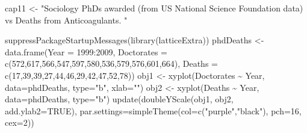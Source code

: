 \documentclass[
  10pt,
  b5paper]{book}
\newenvironment{Shaded}{\begin{snugshade}}{\end{snugshade}}
\newcommand{\AttributeTok}[1]{\textcolor[rgb]{0.77,0.63,0.00}{#1}}
\newcommand{\ConstantTok}[1]{\textcolor[rgb]{0.00,0.00,0.00}{#1}}
\newcommand{\DecValTok}[1]{\textcolor[rgb]{0.00,0.00,0.81}{#1}}
\newcommand{\FunctionTok}[1]{\textcolor[rgb]{0.00,0.00,0.00}{#1}}
\newcommand{\NormalTok}[1]{#1}
\newcommand{\OtherTok}[1]{\textcolor[rgb]{0.56,0.35,0.01}{#1}}
\newcommand{\SpecialCharTok}[1]{\textcolor[rgb]{0.00,0.00,0.00}{#1}}
\newcommand{\StringTok}[1]{\textcolor[rgb]{0.31,0.60,0.02}{#1}}
\begin{document}
\begin{Shaded}
\begin{Highlighting}[]
\NormalTok{cap11 }\OtherTok{\textless{}{-}} \StringTok{"Sociology PhDs awarded (from US National Science }
\StringTok{Foundation data) vs Deaths from Anticoagulants.}
\StringTok{"}
\end{Highlighting}
\end{Shaded}

\begin{Shaded}
\begin{Highlighting}[]
\FunctionTok{suppressPackageStartupMessages}\NormalTok{(}\FunctionTok{library}\NormalTok{(latticeExtra))}
\NormalTok{phdDeaths }\OtherTok{\textless{}{-}} \FunctionTok{data.frame}\NormalTok{(}\AttributeTok{Year =} \DecValTok{1999}\SpecialCharTok{:}\DecValTok{2009}\NormalTok{,}
\AttributeTok{Doctorates =} \FunctionTok{c}\NormalTok{(}\DecValTok{572}\NormalTok{,}\DecValTok{617}\NormalTok{,}\DecValTok{566}\NormalTok{,}\DecValTok{547}\NormalTok{,}\DecValTok{597}\NormalTok{,}\DecValTok{580}\NormalTok{,}\DecValTok{536}\NormalTok{,}\DecValTok{579}\NormalTok{,}\DecValTok{576}\NormalTok{,}\DecValTok{601}\NormalTok{,}\DecValTok{664}\NormalTok{),}
\AttributeTok{Deaths =} \FunctionTok{c}\NormalTok{(}\DecValTok{17}\NormalTok{,}\DecValTok{39}\NormalTok{,}\DecValTok{39}\NormalTok{,}\DecValTok{27}\NormalTok{,}\DecValTok{44}\NormalTok{,}\DecValTok{46}\NormalTok{,}\DecValTok{29}\NormalTok{,}\DecValTok{42}\NormalTok{,}\DecValTok{47}\NormalTok{,}\DecValTok{52}\NormalTok{,}\DecValTok{78}\NormalTok{))}
\NormalTok{obj1 }\OtherTok{\textless{}{-}} \FunctionTok{xyplot}\NormalTok{(Doctorates }\SpecialCharTok{\textasciitilde{}}\NormalTok{ Year, }\AttributeTok{data=}\NormalTok{phdDeaths, }\AttributeTok{type=}\StringTok{"b"}\NormalTok{, }\AttributeTok{xlab=}\StringTok{""}\NormalTok{)}
\NormalTok{obj2 }\OtherTok{\textless{}{-}} \FunctionTok{xyplot}\NormalTok{(Deaths }\SpecialCharTok{\textasciitilde{}}\NormalTok{ Year, }\AttributeTok{data=}\NormalTok{phdDeaths, }\AttributeTok{type=}\StringTok{"b"}\NormalTok{)}
\FunctionTok{update}\NormalTok{(}\FunctionTok{doubleYScale}\NormalTok{(obj1, obj2, }\AttributeTok{add.ylab2=}\ConstantTok{TRUE}\NormalTok{),}
       \AttributeTok{par.settings=}\FunctionTok{simpleTheme}\NormalTok{(}\AttributeTok{col=}\FunctionTok{c}\NormalTok{(}\StringTok{"purple"}\NormalTok{,}\StringTok{"black"}\NormalTok{),}
                                \AttributeTok{pch=}\DecValTok{16}\NormalTok{, }\AttributeTok{cex=}\DecValTok{2}\NormalTok{))}
\end{Highlighting}
\end{Shaded}
\end{document}
